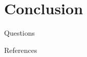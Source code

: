 \documentclass{beamer}
\begin{document}

\section{Conclusion}

\begin{frame}
    \begin{center}
        \huge
        Questions
    \end{center}
\end{frame}


\appendix

\begin{frame}[allowframebreaks]{References}
    
    
\end{frame}

\end{document}
